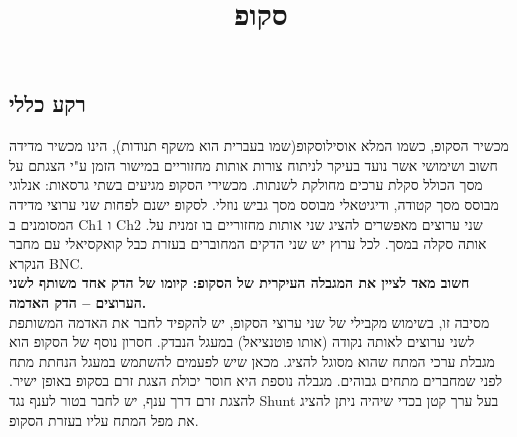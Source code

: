\documentclass[12pt,a4paper]{article}
\begin{document}
	\begin{hebrew}
		\title{סקופ}
		\maketitle
	\end{hebrew}


\begin{hebrew}
	\section{רקע כללי}
			מכשיר הסקופ, כשמו המלא אוסילוסקופ(שמו בעברית הוא משקף תנודות), הינו מכשיר מדידה חשוב ושימושי אשר נועד בעיקר לניתוח צורות אותות מחזוריים במישור
			הזמן ע"י הצגתם על מסך הכולל סקלת ערכים מחולקת לשנתות. מכשירי הסקופ מגיעים בשתי גרסאות: אנלוגי מבוסס מסך קטודה,
			ודיגיטאלי מבוסס מסך גביש נוזלי.
			לסקופ ישנם לפחות שני ערוצי מדידה המסומנים ב Ch1 ו Ch2 .שני ערוצים מאפשרים להציג שני אותות מחזוריים בו זמנית על אותה
			סקלה במסך. לכל ערוץ יש שני הדקים המחוברים בעזרת כבל קואקסיאלי עם מחבר הנקרא BNC.\\
			
	\textbf{חשוב מאד לציין את המגבלה העיקרית של הסקופ: קיומו של הדק אחד משותף לשני הערוצים – הדק האדמה.} \\
	
			מסיבה זו, בשימוש מקבילי של שני ערוצי הסקופ, יש להקפיד לחבר את האדמה המשותפת לשני ערוצים לאותה נקודה (אותו
			פוטנציאל) במעגל הנבדק.
			חסרון נוסף של הסקופ הוא מגבלת ערכי המתח שהוא מסוגל להציג. מכאן שיש לפעמים להשתמש במעגל הנחתת מתח לפני שמחברים
			מתחים גבוהים.
			מגבלה נוספת היא חוסר יכולת הצגת זרם בסקופ באופן ישיר. להצגת זרם דרך ענף, יש לחבר בטור לענף נגד Shunt בעל ערך קטן בכדי
			שיהיה ניתן להציג את מפל המתח עליו בעזרת הסקופ.
	
\end{hebrew}
\end{document}
